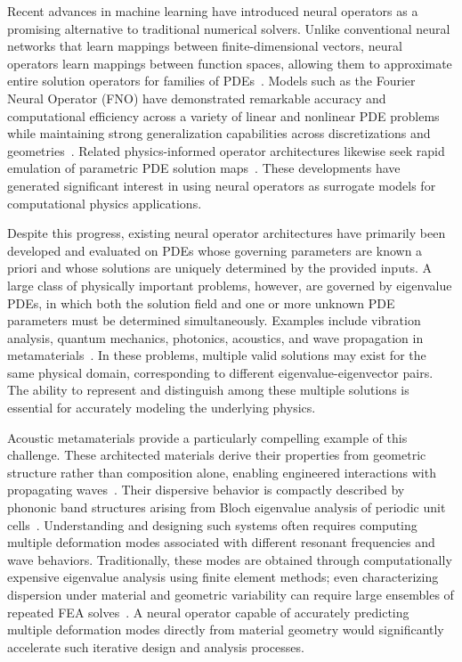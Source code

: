 \documentclass[preprint,review,12pt,numafflabel]{elsarticle}
\begin{document}
Recent advances in machine learning have introduced neural operators as a promising alternative to traditional numerical solvers. Unlike conventional neural networks that learn mappings between finite-dimensional vectors, neural operators learn mappings between function spaces, allowing them to approximate entire solution operators for families of PDEs~\cite{kovachki2023neural,lu2021deeponet}. Models such as the Fourier Neural Operator (FNO) have demonstrated remarkable accuracy and computational efficiency across a variety of linear and nonlinear PDE problems while maintaining strong generalization capabilities across discretizations and geometries~\cite{li2021fno}. Related physics-informed operator architectures likewise seek rapid emulation of parametric PDE solution maps~\cite{wang2021pidon}. These developments have generated significant interest in using neural operators as surrogate models for computational physics applications.

Despite this progress, existing neural operator architectures have primarily been developed and evaluated on PDEs whose governing parameters are known a priori and whose solutions are uniquely determined by the provided inputs. A large class of physically important problems, however, are governed by eigenvalue PDEs, in which both the solution field and one or more unknown PDE parameters must be determined simultaneously. Examples include vibration analysis, quantum mechanics, photonics, acoustics, and wave propagation in metamaterials~\cite{finol2019eigenvalue,hussein2014dynamics}. In these problems, multiple valid solutions may exist for the same physical domain, corresponding to different eigenvalue-eigenvector pairs. The ability to represent and distinguish among these multiple solutions is essential for accurately modeling the underlying physics.

Acoustic metamaterials provide a particularly compelling example of this challenge. These architected materials derive their properties from geometric structure rather than composition alone, enabling engineered interactions with propagating waves~\cite{cummer2016controlling,liao2021acoustic}. Their dispersive behavior is compactly described by phononic band structures arising from Bloch eigenvalue analysis of periodic unit cells~\cite{kushwaha1993acoustic,hussein2014dynamics}. Understanding and designing such systems often requires computing multiple deformation modes associated with different resonant frequencies and wave behaviors. Traditionally, these modes are obtained through computationally expensive eigenvalue analysis using finite element methods; even characterizing dispersion under material and geometric variability can require large ensembles of repeated FEA solves~\cite{Zhang2024uq}. A neural operator capable of accurately predicting multiple deformation modes directly from material geometry would significantly accelerate such iterative design and analysis processes.
\end{document}
